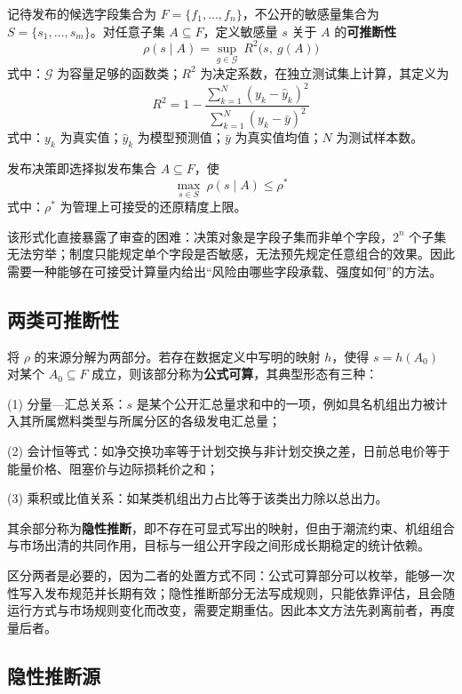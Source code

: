 \documentclass[UTF8,zihao=5,twoside]{ctexart}
\begin{document}
记待发布的候选字段集合为 $F=\{f_1,\dots,f_n\}$，不公开的敏感量集合为 $S=\{s_1,\dots,s_m\}$。对任意子集 $A\subseteq F$，定义敏感量 $s$ 关于 $A$ 的\textbf{可推断性}
\begin{equation}
\rho(s\mid A)=\sup_{g\in\mathcal{G}}\ R^2\big(s,\ g(A)\big)
\end{equation}
式中：$\mathcal{G}$ 为容量足够的函数类；$R^2$ 为决定系数，在独立测试集上计算，其定义为
\begin{equation}
R^2=1-\frac{\sum_{k=1}^{N}(y_k-\hat y_k)^2}{\sum_{k=1}^{N}(y_k-\bar y)^2}
\end{equation}
式中：$y_k$ 为真实值；$\hat y_k$ 为模型预测值；$\bar y$ 为真实值均值；$N$ 为测试样本数。

发布决策即选择拟发布集合 $A\subseteq F$，使
\begin{equation}
\max_{s\in S}\ \rho(s\mid A)\le \rho^{\ast}
\end{equation}
式中：$\rho^{\ast}$ 为管理上可接受的还原精度上限。

该形式化直接暴露了审查的困难：决策对象是字段子集而非单个字段，$2^n$ 个子集无法穷举；制度只能规定单个字段是否敏感，无法预先规定任意组合的效果。因此需要一种能够在可接受计算量内给出“风险由哪些字段承载、强度如何”的方法。

\subsection{两类可推断性}

将 $\rho$ 的来源分解为两部分。若存在数据定义中写明的映射 $h$，使得 $s=h(A_0)$ 对某个 $A_0\subseteq F$ 成立，则该部分称为\textbf{公式可算}，其典型形态有三种：

(1) 分量—汇总关系：$s$ 是某个公开汇总量求和中的一项，例如具名机组出力被计入其所属燃料类型与所属分区的各级发电汇总量；

(2) 会计恒等式：如净交换功率等于计划交换与非计划交换之差，日前总电价等于能量价格、阻塞价与边际损耗价之和；

(3) 乘积或比值关系：如某类机组出力占比等于该类出力除以总出力。

其余部分称为\textbf{隐性推断}，即不存在可显式写出的映射，但由于潮流约束、机组组合与市场出清的共同作用，目标与一组公开字段之间形成长期稳定的统计依赖。

区分两者是必要的，因为二者的处置方式不同：公式可算部分可以枚举，能够一次性写入发布规范并长期有效；隐性推断部分无法写成规则，只能依靠评估，且会随运行方式与市场规则变化而改变，需要定期重估。因此本文方法先剥离前者，再度量后者。

\subsection{隐性推断源}
\end{document}
